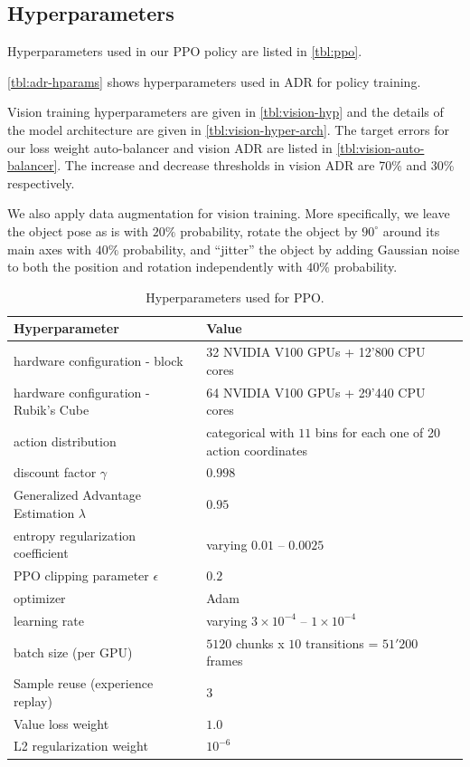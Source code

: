 \FloatBarrier

\subsection{Hyperparameters}
\label{app:hyperparameters}

Hyperparameters used in our PPO policy are listed in \autoref{tbl:ppo}.

\autoref{tbl:adr-hparams} shows hyperparameters used in ADR for policy training.

Vision training hyperparameters are given in \autoref{tbl:vision-hyp} and the details of the model architecture are given in \autoref{tbl:vision-hyper-arch}. The target errors for our loss weight auto-balancer and vision ADR are listed in \autoref{tbl:vision-auto-balancer}. The increase and decrease thresholds in vision ADR are 70\% and 30\% respectively.

We also apply data augmentation for vision training. More specifically, we leave the object pose as is with $20\%$ probability, rotate the object by $90^{\circ}$ around its main axes with $40\%$ probability, and ``jitter'' the object by adding Gaussian noise to both the position and rotation independently with $40\%$ probability.


\begin{table}[h!]
    \footnotesize
    \centering
    \caption{Hyperparameters used for PPO.}
    \renewcommand{\arraystretch}{1.3}
    \begin{tabular}{@{}ll@{}}
        \toprule
        \textbf{Hyperparameter} & \textbf{Value} \\ 
        \midrule
        hardware configuration - block & 32 NVIDIA V100 GPUs + 12'800 CPU cores \\ 
        hardware configuration - Rubik's Cube & 64 NVIDIA V100 GPUs + 29'440 CPU cores \\ 
        action distribution & categorical with $11$ bins for each one of 20 action coordinates \\
        discount factor $\gamma$ & $0.998$ \\
        Generalized Advantage Estimation $\lambda$ & $0.95$ \\
        entropy regularization coefficient & varying $0.01$ -- $0.0025$ \\
        PPO clipping parameter $\epsilon$ & $0.2$ \\
        optimizer & Adam~\citep{Kingma2014AdamAM} \\
        learning rate & varying $3 \times 10^{-4}$ -- $1 \times 10^{-4}$  \\
        batch size (per GPU) & $5120$ chunks x $10$ transitions = $51'200$ frames \\
        Sample reuse (experience replay) & 3 \\
        Value loss weight & $1.0$ \\
        L2 regularization weight & $10^{-6}$ \\
    \bottomrule\end{tabular}
    \label{tbl:ppo}
\end{table}

